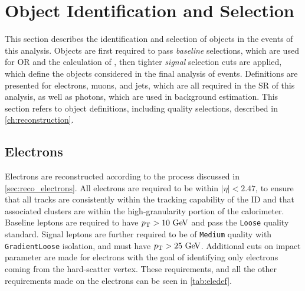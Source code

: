 
\chapter{Object Identification and Selection} %
\label{ch:objects} 

This section describes the identification and selection of objects in the events of this analysis. Objects are first required to pass \textit{baseline} selections, which are used for \acf{OR} and the calculation of \met, then tighter \textit{signal} selection cuts are applied, which define the objects considered in the final analysis of events. Definitions are presented for electrons, muons, and jets, which are all required in the \ac{SR} of this analysis, as well as photons, which are used in background estimation. This section refers to object definitions, including quality selections, described in \autoref{ch:reconstruction}.


\section{Electrons}

Electrons are reconstructed according to the process discussed in \autoref{sec:reco_electrons}. All electrons are required to be within $|\eta|<2.47$, to ensure that all tracks are consistently within the tracking capability of the \ac{ID} and that associated clusters are within the high-granularity portion of the calorimeter. Baseline leptons are required to have $\pt>10\gev$ and pass the \texttt{Loose} quality standard. Signal leptons are further required to be of \texttt{Medium} quality with \texttt{GradientLoose} isolation, and must have $\pt>25\gev$. Additional cuts on impact parameter are made for electrons with the goal of identifying only electrons coming from the hard-scatter vertex. These requirements, and all the other requirements made on the electrons can be seen in \autoref{tab:eledef}. 

